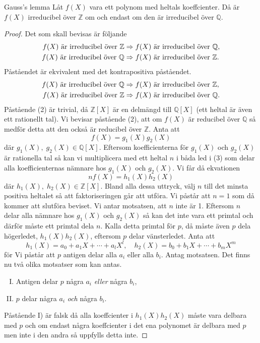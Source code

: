 \documentclass{article}
\theoremstyle{definition}
\begin{document}
\begin{mylemma}{Gauss's lemma}{}
Låt $f(X)$ vara ett polynom med heltals koeffcienter. Då är $f(X)$ irreducibel över $\mathbb{Z}$ om och endast om den är irreducibel över $\mathbb{Q}$.
\end{mylemma}
\begin{proof}
  Det som skall bevisas är följande
  \begin{align*}
    f(X) \textnormal{ är irreducibel över } \mathbb{Z} &\Rightarrow f(X) \textnormal{ är irreducibel över } \mathbb{Q}, \\
    f(X) \textnormal{ är irreducibel över } \mathbb{Q} &\Rightarrow f(X) \textnormal{ är irreducibel över } \mathbb{Z}.
  \end{align*}
  Påståendet är ekvivalent med det kontrapositiva påståendet.
  \begin{align}
    f(X) \textnormal{ är irreducibel över } \mathbb{Q} &\Rightarrow f(X) \textnormal{ är irreducibel över } \mathbb{Z}, \\
    f(X) \textnormal{ är irreducibel över } \mathbb{Z} &\Rightarrow f(X) \textnormal{ är irreducibel över } \mathbb{Q}.
  \end{align}
  Påstående (2) är trivial, då $\mathbb{Z}[X]$ är en delmängd till $\mathbb{Q}[X]$ (ett heltal är även ett rationellt tal). Vi bevisar påstående (2),
  att om $f(X)$ är reducibel över $\mathbb{Q}$ så medför detta att den också är reducibel över $\mathbb{Z}$. Anta att
  \begin{equation}
    f(X) = g_1(X)g_2(X)
  \end{equation}
  där $g_1(X), \; g_2(X) \in \mathbb{Q}[X]$. Eftersom koefficienterna för $g_1(X)$ och $g_2(X)$ är rationella tal så kan vi multiplicera med ett
  heltal $n$ i båda led i (3) som delar alla koefficienternas nämnare hos $g_1(X)$ och $g_2(X)$. Vi får då ekvationen
  \begin{equation}
    nf(X) = h_1(X)h_2(X)
  \end{equation}
  där $h_1(X), \; h_2(X) \in \mathbb{Z}[X]$. Bland alla dessa uttryck, välj $n$ till det minsta positiva heltalet
  så att faktoriseringen går att utföra. Vi påstår att $n = 1$ som då kommer att slutföra beviset. Vi antar motsatsen, att $n$ inte är 1. Eftersom 
  $n$ delar alla nämnare hos $g_1(X)$ och $g_2(X)$ så kan det inte vara ett primtal och därför måste ett primtal dela $n$. Kalla detta primtal för $p$, då 
  måste även $p$ dela högerledet, $h_1(X)h_2(X)$, eftersom $p$ delar vänsterledet. Anta att 
  \[h_1(X) = a_0 + a_1X + \cdots + a_lX^l, \quad h_2(X) = b_0 + b_1X + \cdots + b_mX^m\]
  för Vi påstår att $p$ antigen delar alla $a_i$ eller alla $b_i$. Antag motsatsen. Det finns nu två olika motsatser som kan antas.
  \begin{enumerate}[I)]
    \item Antigen delar $p$ några $a_i$ \textit{eller} några $b_i$,
    \item $p$ delar några $a_i$ \textit{och} några $b_i$.
  \end{enumerate}
  Påstående I) är falsk då alla koeffcienter i $h_1(X)h_2(X)$ måste vara delbara med $p$ och om endast några koeffcienter i det ena polynomet 
  är delbara med $p$ men inte i den andra så uppfylls detta inte. 


\end{proof}
\end{document}
